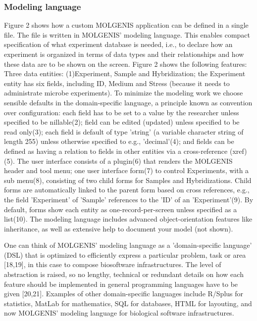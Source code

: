 \documentclass[8pt, twoside, a5paper]{report}
\begin{document}
\subsubsection{Modeling language}

Figure 2 shows how a custom MOLGENIS application can be defined in a single file. The file is written in MOLGENIS' modeling 
language. This enables compact specification of what experiment database is needed, i.e., to declare how an experiment is 
organized in terms of data types and their relationships and how these data are to be shown on the screen. Figure 2 shows 
the following features: Three data entities: (1)Experiment, Sample and Hybridization; the Experiment entity has six fields, 
including ID, Medium and Stress (because it needs to administrate microbe experiments). To minimize the modeling work we 
choose sensible defaults in the domain-specific language, a principle known as convention over configuration: each field has 
to be set to a value by the researcher unless specified to be nillable(2); field can be edited (updated) unless specified to be 
read only(3); each field is default of type 'string' (a variable character string of length 255) unless otherwise specified to 
e.g., 'decimal'(4); and fields can be defined as having a relation to fields in other entities via a cross-reference (xref)(5). 
The user interface consists of a plugin(6) that renders the MOLGENIS header and tool menu; one user interface form(7) to control 
Experiments, with a sub menu(8), consisting of two child forms for Samples and Hybridizations. Child forms are automatically 
linked to the parent form based on cross references, e.g., the field 'Experiment' of 'Sample' references to the 'ID' of an 
'Experiment'(9). By default, forms show each entity as one-record-per-screen unless specified as a list(10). The modeling 
language includes advanced object-orientation features like inheritance, as well as extensive help to document your model 
(not shown).

One can think of MOLGENIS' modeling language as a 'domain-specific language' (DSL) that is optimized to efficiently express 
a particular problem, task or area [18,19], in this case to compose biosoftware infrastructures. The level of abstraction is 
raised, so no lengthy, technical or redundant details on how each feature should be implemented in general programming 
languages have to be given [20,21]. Examples of other domain-specific languages include R/Splus for statistics, MatLab for 
mathematics, SQL for databases, HTML for layouting, and now MOLGENIS' modeling language for biological software infrastructures.
\end{document}
